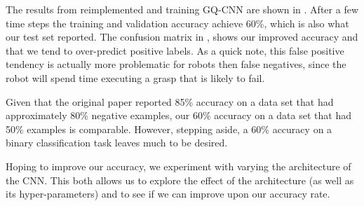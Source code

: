The results from reimplemented and training GQ-CNN are shown in . 
After a few time steps the training and validation accuracy achieve 60\%, which is also what our test set reported. 
The confusion matrix in , shows our improved accuracy and that we tend to over-predict positive labels. 
As a quick note, this false positive tendency is actually more problematic for robots then false negatives, since the robot will spend time executing a grasp that is likely to fail. 

Given that the original paper reported 85\% accuracy on a data set that had approximately 80\% negative examples, our 60\% accuracy on a data set that had 50\% examples is comparable. 
However, stepping aside, a 60\% accuracy on a binary classification task leaves much to be desired. 

Hoping to improve our accuracy, we experiment with varying the architecture of the CNN. 
This both allows us to explore the effect of the architecture (as well as its hyper-parameters) and to see if we can improve upon our accuracy rate. 

